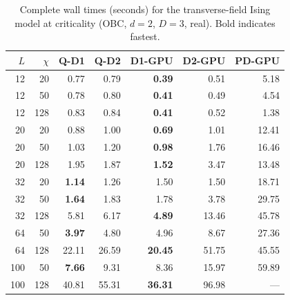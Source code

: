 \documentclass[preprint,12pt]{elsarticle}
\begin{document}
\begin{table}[h]
\centering
\caption{Complete wall times (seconds) for the transverse-field Ising model at criticality (OBC, $d = 2$, $D = 3$, real).  Bold indicates fastest.}
\label{tab:full_tfim}
\begin{tabular}{rr|rr|rrr}
\toprule
$L$ & $\chi$ & Q-D1 & Q-D2 & D1-GPU & D2-GPU & PD-GPU \\
\midrule
12 & 20  & 0.77 & 0.79 & \textbf{0.39} & 0.51 & 5.18 \\
12 & 50  & 0.78 & 0.80 & \textbf{0.41} & 0.49 & 4.54 \\
12 & 128 & 0.83 & 0.84 & \textbf{0.41} & 0.52 & 1.38 \\
20 & 20  & 0.88 & 1.00 & \textbf{0.69} & 1.01 & 12.41 \\
20 & 50  & 1.03 & 1.20 & \textbf{0.98} & 1.76 & 16.46 \\
20 & 128 & 1.95 & 1.87 & \textbf{1.52} & 3.47 & 13.48 \\
32 & 20  & \textbf{1.14} & 1.26 & 1.50 & 1.50 & 18.71 \\
32 & 50  & \textbf{1.64} & 1.83 & 1.78 & 3.78 & 29.75 \\
32 & 128 & 5.81 & 6.17 & \textbf{4.89} & 13.46 & 45.78 \\
64 & 50  & \textbf{3.97} & 4.80 & 4.96 & 8.67 & 27.36 \\
64 & 128 & 22.11 & 26.59 & \textbf{20.45} & 51.75 & 45.55 \\
100 & 50  & \textbf{7.66} & 9.31 & 8.36 & 15.97 & 59.89 \\
100 & 128 & 40.81 & 55.31 & \textbf{36.31} & 96.98 & --- \\
\bottomrule
\end{tabular}
\end{table}
\end{document}
